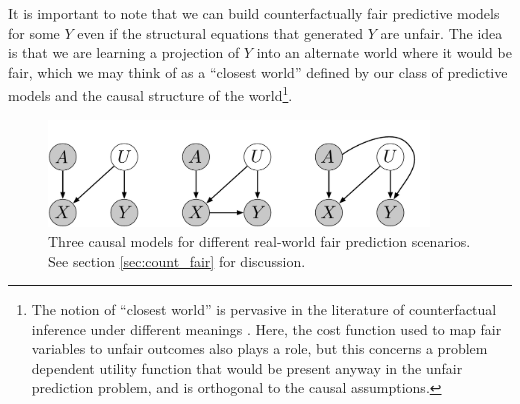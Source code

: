 It is important to note that we can build counterfactually fair
predictive models for some $Y$ even if the 
structural equations that generated $Y$ are unfair. The idea is that we
are learning a projection of $Y$ into an alternate world where it
would be fair, which we may think of as a
``closest world'' defined by our class of predictive models and the
causal structure of the world\footnote{The notion of ``closest world''
  is pervasive in the literature of counterfactual inference under
  different meanings \citep{pearl:00, halpern:16}.  Here, the cost
  function used to map fair variables to unfair outcomes also plays a
  role, but this concerns a problem dependent utility function that
  would be present anyway in the unfair prediction problem, and is
  orthogonal to the causal assumptions.}.







\begin{figure}[th]
\begin{center}
\vspace{-2ex}
\centerline{\includegraphics[width=0.9\textwidth]{simple_models_no_q2}}
\vspace{-2ex}
\caption{Three causal models for different real-world fair prediction scenarios.\label{figure.simple_models} See section \ref{sec:count_fair} for discussion.}
\vspace{-2ex}
\end{center}
\end{figure}

